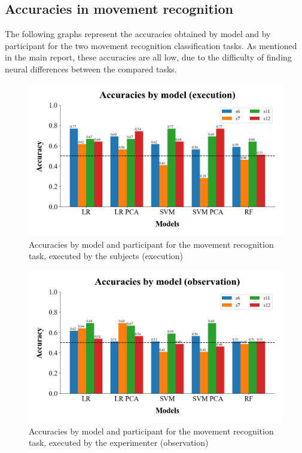 \documentclass[10pt,conference,compsocconf]{IEEEtran}
\begin{document}
\subsection{Accuracies in movement recognition}
The following graphs represent the accuracies obtained by model and by participant for the two movement recognition classification tasks. As mentioned in the main report, these accuracies are all low, due to the difficulty of finding neural differences between the compared tasks.

\begin{figure}[h!]
    \center
    \includegraphics[width=\linewidth]{../Code/figures/accuracies_across_part_ex.png}
    \caption{Accuracies by model and participant for the movement recognition task, executed by the subjects (execution)}
    \label{appfig:accuracies_across_part_ex}
\end{figure}
\FloatBarrier

\begin{figure}[h!]
    \center
    \includegraphics[width=\linewidth]{../Code/figures/accuracies_across_part_obs.png}
    \caption{Accuracies by model and participant for the movement recognition task, executed by the experimenter (observation)}
    \label{appfig:accuracies_across_part_obs}
\end{figure}
\FloatBarrier
\end{document}
